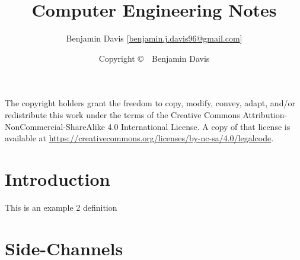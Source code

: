 \documentclass[letterpaper,12pt]{book}
\title{Computer Engineering Notes}
\author{
  Benjamin Davis [\href{mailto:benjamin.j.davis96@gmail.com}{benjamin.j.davis96@gmail.com}]
}
\date{Copyright \copyright\ \the\year\ Benjamin Davis}
\begin{document}
  \pagestyle{simple}
  \maketitle
  
  \begin{center}
    \vspace*{\fill}
    The copyright holders grant the freedom to copy, modify, convey, adapt, and/or redistribute this work
    under the terms of the Creative Commons Attribution-NonCommercial-ShareAlike 4.0
    International License. A copy of that license is available at
    \url{https://creativecommons.org/licenses/by-nc-sa/4.0/legalcode}.
    \vspace*{\fill}
  \end{center}

  \frontmatter
  \pagestyle{plain}

  \tableofcontents

  \mainmatter

  \chapter{Introduction}
  \label{chap:introduction}

    \begin{defbox}
      \label{def:example2}
      This is an example 2 definition
    \end{defbox}
  
  \chapter{Side-Channels}
  \label{chap:side_channels}

    
\end{document}

